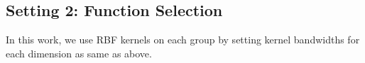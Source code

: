 
\subsection{Setting 2: Function Selection}

In this work, we use RBF kernels on each group by setting kernel bandwidths
for each dimension as same as above.
